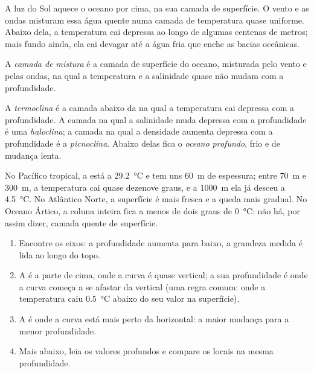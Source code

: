 A luz do Sol aquece o oceano por cima, na sua camada de superfície. O vento
e as ondas misturam essa água quente numa camada de temperatura quase
uniforme. Abaixo dela, a temperatura cai depressa ao longo de algumas
centenas de metros; mais fundo ainda, ela cai devagar até a água fria que
enche as bacias oceânicas.

\begin{definition}\label{def:g10:layered-ocean:mixed-layer}
A \emph{camada de mistura} é a camada de superfície
do oceano, misturada pelo vento e pelas ondas, na qual a temperatura e a
salinidade quase não mudam com a profundidade.
\end{definition}

\begin{definition}\label{def:g10:layered-ocean:thermocline}
A \emph{termoclina} é a camada abaixo da 
na qual a temperatura cai depressa com a profundidade. A camada na qual a
salinidade muda depressa com a profundidade é uma
\emph{haloclina}; a camada na qual a densidade aumenta
depressa com a profundidade é a \emph{picnoclina}. Abaixo
delas fica o \emph{oceano profundo}, frio e de
mudança lenta.
\end{definition}

No Pacífico tropical, a  está a \qty{29.2}{\degreeCelsius}
e tem uns \qty{60}{m} de espessura; entre \qty{70}{m} e \qty{300}{m}, a
temperatura cai quase dezenove graus, e a \qty{1000}{m} ela já desceu a
\qty{4.5}{\degreeCelsius}. No Atlântico Norte, a superfície é mais fresca e
a queda mais gradual. No Oceano Ártico, a coluna inteira fica a menos de
dois graus de \qty{0}{\degreeCelsius}: não há, por assim dizer, camada
quente de superfície.

\begin{method}\label{met:g10:layered-ocean:profile}
\begin{enumerate}
  \item Encontre os eixos: a profundidade aumenta para baixo, a grandeza
        medida é lida ao longo do topo.
  \item A  é a parte de cima, onde a curva é quase
        vertical; a sua profundidade é onde a curva começa a se afastar da
        vertical (uma regra comum: onde a temperatura caiu
        \qty{0.5}{\degreeCelsius} abaixo do seu valor na superfície).
  \item A  é onde a curva está mais perto da horizontal: a maior
        mudança para a menor profundidade.
  \item Mais abaixo, leia os valores profundos e compare os locais na mesma
        profundidade.
\end{enumerate}
\end{method}


